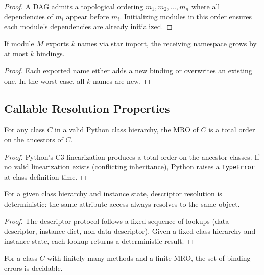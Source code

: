 \documentclass[11pt]{article}
\begin{document}
\begin{proof}
A DAG admits a topological ordering $m_1, m_2, \ldots, m_n$
where all dependencies of $m_i$ appear before $m_i$.
Initializing modules in this order ensures each module's
dependencies are already initialized.
\end{proof}

\begin{lemma}
\label{lem:star-bound}
If module $M$ exports $k$ names via star import, the receiving
namespace grows by at most $k$ bindings.
\end{lemma}

\begin{proof}
Each exported name either adds a new binding or overwrites an
existing one.  In the worst case, all $k$ names are new.
\end{proof}

\subsection{Callable Resolution Properties}
\label{app:callable}

\begin{lemma}
\label{lem:mro-total}
For any class $C$ in a valid Python class hierarchy, the MRO
of $C$ is a total order on the ancestors of $C$.
\end{lemma}

\begin{proof}
Python's C3 linearization produces a total order on the ancestor
classes.  If no valid linearization exists (conflicting inheritance),
Python raises a \texttt{TypeError} at class definition time.
\end{proof}

\begin{lemma}
\label{lem:desc-determ}
For a given class hierarchy and instance state, descriptor
resolution is deterministic: the same attribute access always
resolves to the same object.
\end{lemma}

\begin{proof}
The descriptor protocol follows a fixed sequence of lookups
(data descriptor, instance dict, non-data descriptor).  Given
a fixed class hierarchy and instance state, each lookup
returns a deterministic result.
\end{proof}

\begin{lemma}
\label{lem:binding-decidable}
For a class $C$ with finitely many methods and a finite MRO,
the set of binding errors is decidable.
\end{lemma}
\end{document}
